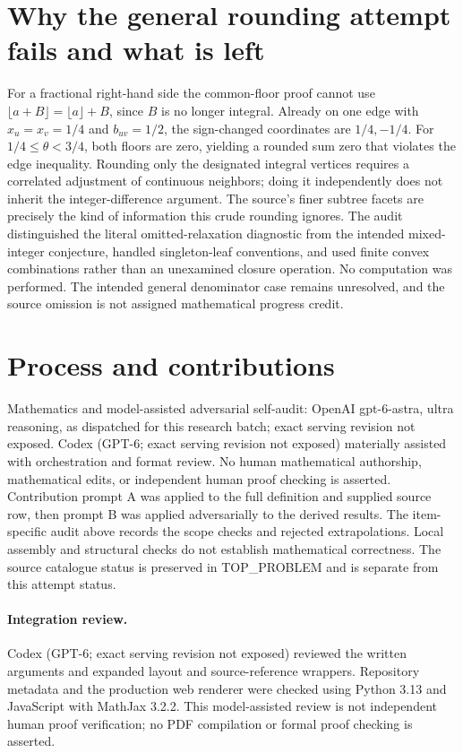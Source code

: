 \documentclass[11pt]{article}
\begin{document}
\section{Why the general rounding attempt fails and what is left}
For a fractional right-hand side the common-floor proof cannot use
$\lfloor a+B\rfloor=\lfloor a\rfloor+B$, since $B$ is no longer integral.
Already on one edge with $x_u=x_v=1/4$ and $b_{uv}=1/2$, the sign-changed
coordinates are $1/4,-1/4$. For $1/4\le\theta<3/4$, both floors are
zero, yielding a rounded sum zero that violates the edge inequality.
Rounding only the designated integral vertices requires a correlated
adjustment of continuous neighbors; doing it independently does not inherit
the integer-difference argument. The source's finer subtree facets are
precisely the kind of information this crude rounding ignores.
The audit distinguished the literal omitted-relaxation diagnostic from the
intended mixed-integer conjecture, handled singleton-leaf conventions, and
used finite convex combinations rather than an unexamined closure operation.
No computation was performed. The intended general denominator case remains
unresolved, and the source omission is not assigned mathematical progress credit.

\section{Process and contributions}
Mathematics and model-assisted adversarial self-audit: OpenAI gpt-6-astra, ultra reasoning, as dispatched for this research batch; exact serving revision not exposed. Codex (GPT-6; exact serving revision not exposed) materially assisted with orchestration and format review. No human mathematical authorship, mathematical edits, or independent human proof checking is asserted.
Contribution prompt A was applied to the full definition and supplied source row, then prompt B was applied adversarially to the derived results. The item-specific audit above records the scope checks and rejected extrapolations. Local assembly and structural checks do not establish mathematical correctness. The source catalogue status is preserved in TOP\_PROBLEM and is separate from this attempt status.
\paragraph{Integration review.} Codex (GPT-6; exact serving revision not exposed) reviewed the written arguments and expanded layout and source-reference wrappers. Repository metadata and the production web renderer were checked using Python 3.13 and JavaScript with MathJax 3.2.2. This model-assisted review is not independent human proof verification; no PDF compilation or formal proof checking is asserted.
\end{document}
